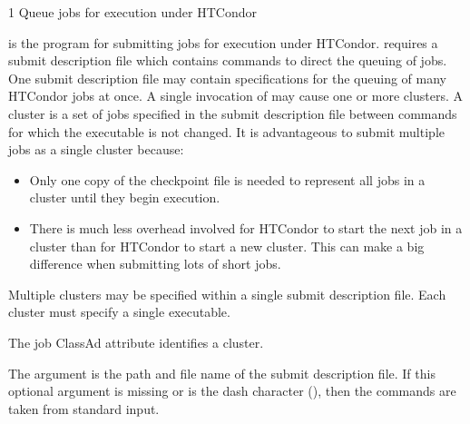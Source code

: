 \begin{ManPage}{\label{man-condor-submit}}{1}
{Queue jobs for execution under HTCondor}

\Synopsis {}
\ToolDebugOption
\Lbr{}  \Opt{\Dots}\Rbr 
{}

\Description

 is the program for submitting jobs for execution
under HTCondor.
 requires a submit description file which contains commands
to direct the queuing of jobs.
One submit description file may contain
specifications for the queuing of many HTCondor jobs at once.
A single invocation of  may cause one or
more clusters.
A cluster is a set of jobs
specified in the submit description file
between  commands for which the executable is not changed.
It is advantageous to submit
multiple jobs as a single cluster because:
\begin{itemize}
\item Only one copy of the checkpoint file is needed to 
represent all jobs in a cluster until they begin execution.
\item There is much less overhead involved for HTCondor to start the next
job in a cluster than for HTCondor to start a new cluster.  This can make
a big difference when submitting lots of short jobs.
\end{itemize}

Multiple clusters may be specified within a single
submit description file.
Each cluster must specify a single executable.

The job ClassAd attribute  identifies a cluster.

The  argument is the path and file name of 
the submit description file. 
If this optional argument is missing or is the dash character (\Expr{-}),
then the commands are taken from standard input.


\end{ManPage}
